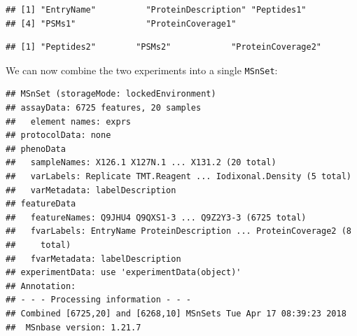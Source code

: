 \begin{knitrout}
\color{fgcolor}\begin{kframe}
\begin{alltt}
\hlstd{(hyperLOPIT2015ms3r1)[}\hlopt{:}\hlstd{]} \hlkwb{<-} \hlstd{(}\hlstd{(hyperLOPIT2015ms3r1)[}\hlopt{:}\hlstd{],} \hlstd{)}
 \hlkwb{<-}  \hlstd{,}  \hlstd{=} \hlstd{)}
 \hlkwb{<-} \hlstd{(hyperLOPIT2015ms3r1)[}\hlopt{:}\hlstd{]}
 \hlkwb{<-} \hlstd{(hyperLOPIT2015ms3r2)[}\hlopt{:}\hlstd{]}
\end{alltt}
\begin{verbatim}
## [1] "EntryName"          "ProteinDescription" "Peptides1"         
## [4] "PSMs1"              "ProteinCoverage1"
\end{verbatim}
\begin{alltt}
\end{alltt}
\begin{verbatim}
## [1] "Peptides2"        "PSMs2"            "ProteinCoverage2"
\end{verbatim}
\end{kframe}
\end{knitrout}

We can now combine the two experiments into a single \texttt{MSnSet}:

\begin{knitrout}
\color{fgcolor}\begin{kframe}
\begin{alltt}
 \hlkwb{<-} \hlopt{::}
\end{alltt}
\begin{verbatim}
## MSnSet (storageMode: lockedEnvironment)
## assayData: 6725 features, 20 samples 
##   element names: exprs 
## protocolData: none
## phenoData
##   sampleNames: X126.1 X127N.1 ... X131.2 (20 total)
##   varLabels: Replicate TMT.Reagent ... Iodixonal.Density (5 total)
##   varMetadata: labelDescription
## featureData
##   featureNames: Q9JHU4 Q9QXS1-3 ... Q9Z2Y3-3 (6725 total)
##   fvarLabels: EntryName ProteinDescription ... ProteinCoverage2 (8
##     total)
##   fvarMetadata: labelDescription
## experimentData: use 'experimentData(object)'
## Annotation:  
## - - - Processing information - - -
## Combined [6725,20] and [6268,10] MSnSets Tue Apr 17 08:39:23 2018 
##  MSnbase version: 1.21.7
\end{verbatim}
\end{kframe}
\end{knitrout}


